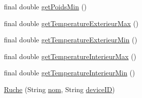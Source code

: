 \begin{DoxyCompactItemize}
final double \hyperlink{classcom_1_1example_1_1bee__honeyt_1_1_ruche_a71764fe95390c37cce877a60c6a630e3}{get\+Poids\+Min} ()
\item 
final double \hyperlink{classcom_1_1example_1_1bee__honeyt_1_1_ruche_a9fbd64d989fba4ae535329192a2396ff}{get\+Temperature\+Exterieur\+Max} ()
\item 
final double \hyperlink{classcom_1_1example_1_1bee__honeyt_1_1_ruche_ada637700d05524a98a143074c43acb7e}{get\+Temperature\+Exterieur\+Min} ()
\item 
final double \hyperlink{classcom_1_1example_1_1bee__honeyt_1_1_ruche_a460323968438c2f0ba77b4d7e92c53bd}{get\+Temperature\+Interieur\+Max} ()
\item 
final double \hyperlink{classcom_1_1example_1_1bee__honeyt_1_1_ruche_a8627a17c2f48ceef15f665065da86255}{get\+Temperature\+Interieur\+Min} ()
\item 
\hyperlink{classcom_1_1example_1_1bee__honeyt_1_1_ruche_aab68c5c3479f1def1b57a4d8b9cca9cd}{Ruche} (String \hyperlink{classcom_1_1example_1_1bee__honeyt_1_1_ruche_ac72094a8a08cf8f485be1456863bc4bd}{nom}, String \hyperlink{classcom_1_1example_1_1bee__honeyt_1_1_ruche_a7126c2ff9e0b3b5365e042c5309ad775}{device\+ID})
\item 

\end{DoxyCompactItemize}
